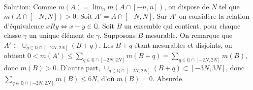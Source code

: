 \documentclass{report}
\begin{document}
\subsection{} \\ \\

Solution: Comme $m(A) = \lim_n m(A\cap [-n,n])$, on dispose de $N$ tel que $m(A\cap [-N,N])>0$. Soit $A'=A\cap [-N,N]$. Sur $A'$ on considère la relation d'équivalence $xRy\iff x-y\in\mathbb Q$. Soit $B$ un ensemble qui contient, pour chaque classe $\gamma$ un unique élément de $\gamma$. Supposons $B$ mesurable. On remarque que $A'\subset \cup_{q\in \mathbb Q\cap [-2N,2N]}(B+q)$. Les $B+q$ étant mesurables et disjoints, on obtient $0<m(A')\leq \sum_{q\in \mathbb Q\cap [-2N,2N]}m(B+q) = \sum_{q\in \mathbb Q\cap [-2N,2N]}m(B) $, donc $m(B)>0$. \newline
D'autre part, $\cup_{q\in \mathbb Q\cap [-2N,2N]}(B+q) \subset [-3N,3N]$, donc $\sum_{q\in \mathbb Q\cap [-2N,2N]}m(B) \leq 6N$, d'où $m(B)=0$.\newline
Absurde.

\newpage 
\subsection{} \\ \\
\end{document}
